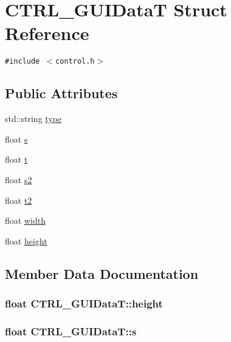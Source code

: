 \hypertarget{struct_c_t_r_l___g_u_i_data_t}{
\section{CTRL\_\-GUIDataT Struct Reference}
\label{struct_c_t_r_l___g_u_i_data_t}
}
{\tt \#include $<$control.h$>$}

\subsection*{Public Attributes}
\begin{CompactItemize}
\item 
std::string \hyperlink{struct_c_t_r_l___g_u_i_data_t_69e6d7288b802c64b16e806876913751}{type}
\item 
float \hyperlink{struct_c_t_r_l___g_u_i_data_t_37fc42d4bc1063b59ff2963886371ac9}{s}
\item 
float \hyperlink{struct_c_t_r_l___g_u_i_data_t_6ad0aba01a9c3c1520528d02bdd664a5}{t}
\item 
float \hyperlink{struct_c_t_r_l___g_u_i_data_t_489d37cf911ba0757d0fddf3a8ceac33}{s2}
\item 
float \hyperlink{struct_c_t_r_l___g_u_i_data_t_e7f81276c9a799462b5410a7758bec94}{t2}
\item 
float \hyperlink{struct_c_t_r_l___g_u_i_data_t_9c2d04bc9a024f24c51aef054a79c219}{width}
\item 
float \hyperlink{struct_c_t_r_l___g_u_i_data_t_f6b990c414f4f60fb16a2f23f38a0d2c}{height}
\end{CompactItemize}


\subsection{Member Data Documentation}
\hypertarget{struct_c_t_r_l___g_u_i_data_t_f6b990c414f4f60fb16a2f23f38a0d2c}{
\subsubsection[{height}]{\setlength{\rightskip}{0pt plus 5cm}float {\bf CTRL\_\-GUIDataT::height}}}
\label{struct_c_t_r_l___g_u_i_data_t_f6b990c414f4f60fb16a2f23f38a0d2c}


\hypertarget{struct_c_t_r_l___g_u_i_data_t_37fc42d4bc1063b59ff2963886371ac9}{
\subsubsection[{s}]{\setlength{\rightskip}{0pt plus 5cm}float {\bf CTRL\_\-GUIDataT::s}}}
\label{struct_c_t_r_l___g_u_i_data_t_37fc42d4bc1063b59ff2963886371ac9}


